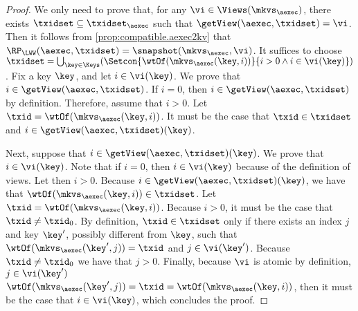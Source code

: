 \begin{proof}
We only need to prove that, for any $\vi \in \Views(\mkvs_{\aexec})$, there exists $\txidset \subseteq \txidset_{\aexec}$ such 
that $\getView(\aexec, \txidset) = \vi$. Then it follows from \cref{prop:compatible.aexec2kv} that 
$\RP_{\LWW}(\aexec, \txidset) = \snapshot(\mkvs_{\aexec}, \vi)$. 
It suffices to choose $\txidset = \bigcup_{\key \in \Keys}(\Setcon{ \wtOf(\mkvs_{\aexec}(\key, i)) }{ i > 0 
\wedge i \in \vi(\key)})$.
Fix a key $\key$, and let $i \in \vi(\key)$. We prove that $i \in \getView(\aexec, \txidset)$. 
If $i = 0$, then $i \in \getView(\aexec, \txidset)$ by definition. 
Therefore, assume that $i > 0$. Let $\txid = \wtOf(\mkvs_{\aexec}(\key, i))$.
It must be the case that $\txid \in \txidset$ and $i \in \getView(\aexec, \txidset)(\key)$.

Next, suppose that $i \in \getView(\aexec, \txidset)(\key)$. We prove that $i \in \vi(\key)$.
Note that if $i = 0$, then $i \in \vi(\key)$ because of the 
definition of views. Let then $i > 0$. Because $i \in \getView(\aexec, \txidset)(\key)$, we have that 
$\wtOf(\mkvs_{\aexec}(\key, i)) \in \txidset$.  Let $\txid = \wtOf(\mkvs_{\aexec}(\key, i))$. Because $i > 0$, 
it must be the case that $\txid \neq \txid_0$.
By definition, $\txid \in \txidset$ only if there 
exists an index $j$ and key $\key'$, possibly different from $\key$, such that $\wtOf(\mkvs_{\aexec}(\key', j)) = \txid$ and $j \in \vi(\key')$. 
Because $\txid \neq \txid_0$ we have that $j > 0$. Finally, because $\vi$ is atomic by definition, $j \in \vi(\key')$
$\wtOf(\mkvs_{\aexec}(\key', j)) = \txid = \wtOf(\mkvs_{\aexec}(\key, i))$, then it must be the case 
that $i \in \vi(\key)$, which concludes the proof.
\end{proof}

